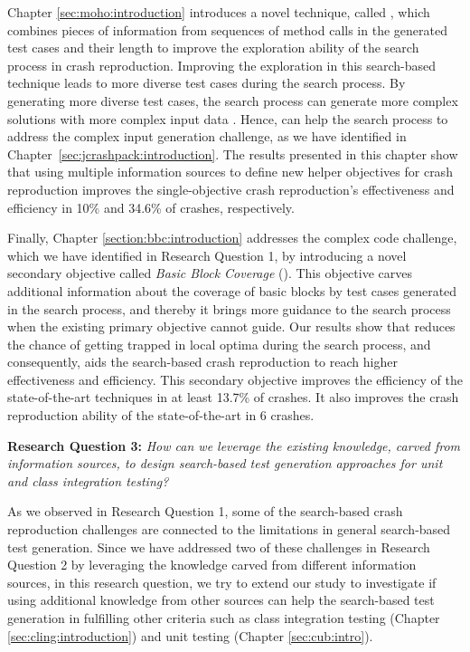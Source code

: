 Chapter \ref{sec:moho:introduction} introduces a novel technique, called \moho, which combines pieces of information from sequences of method calls in the generated test cases and their length to improve the exploration ability of the search process in crash reproduction. Improving the exploration in this search-based technique leads to more diverse test cases during the search process. By generating more diverse test cases, the search process can generate more complex solutions with more complex input data \cite{jensen2004helper}. Hence, \moho can help the search process to address the complex input generation challenge, as we have identified in Chapter~\ref{sec:jcrashpack:introduction}. The results presented in this chapter show that using multiple information sources to define new helper objectives for crash reproduction improves the single-objective crash reproduction's effectiveness and efficiency in 10\% and 34.6\% of crashes, respectively.



Finally, Chapter \ref{section:bbc:introduction} addresses the complex code challenge, which we have identified in Research Question 1, by introducing a novel secondary objective called \textit{Basic Block Coverage} (\bbc). This objective carves additional information about the coverage of basic blocks by test cases generated in the search process, and thereby it brings more guidance to the search process when the existing primary objective cannot guide. Our results show that \bbc reduces the chance of getting trapped in local optima during the search process, and consequently, aids the search-based crash reproduction to reach higher effectiveness and efficiency. This secondary objective improves the efficiency of the state-of-the-art techniques in at least 13.7\% of crashes. It also improves the crash reproduction ability of the state-of-the-art in 6 crashes.


\textbf{Research Question 3: }\textit{How can we leverage the existing knowledge, carved from information sources, to design search-based test generation approaches for unit and class integration testing?}

As we observed in Research Question 1, some of the search-based crash reproduction challenges are connected to the limitations in general search-based test generation. Since we have addressed two of these challenges in Research Question 2 by leveraging the knowledge carved from different information sources, in this research question, we try to extend our study to investigate if using additional knowledge from other sources can help the search-based test generation in fulfilling other criteria such as class integration testing (Chapter \ref{sec:cling:introduction}) and unit testing (Chapter \ref{sec:cub:intro}).


